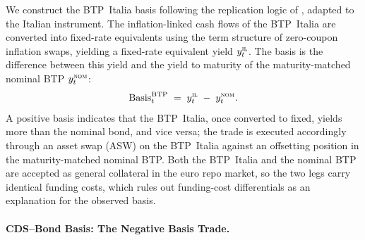 We construct the BTP~Italia basis following the replication logic of
\citet{fleckenstein2014tips}, adapted to the Italian instrument. The
inflation-linked cash flows of the BTP~Italia are converted into
fixed-rate equivalents using the term structure of zero-coupon
inflation swaps, yielding a fixed-rate equivalent yield
$y^{\textsc{il}}_{t}$. The basis is the difference between this yield
and the yield to maturity of the maturity-matched nominal BTP
$y^{\textsc{nom}}_{t}$:
\begin{equation}
\text{Basis}^{\text{BTP}}_{t} \;=\; y^{\textsc{il}}_{t} \;-\;
y^{\textsc{nom}}_{t}.
\label{eq:basis_btp}
\end{equation}
A positive basis indicates that the BTP~Italia, once converted to
fixed, yields more than the nominal bond, and vice versa; the trade is
executed accordingly through an asset swap (ASW) on the BTP~Italia
against an offsetting position in the maturity-matched nominal BTP.
Both the BTP~Italia and the nominal BTP are accepted as general
collateral in the euro repo market, so the two legs carry identical
funding costs, which rules out funding-cost differentials as an
explanation for the observed basis.



\paragraph{CDS--Bond Basis: The Negative Basis Trade.}

